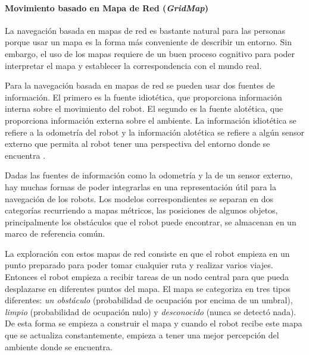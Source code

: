 \paragraph{Movimiento basado en Mapa de Red (\textit{GridMap})}

La navegaci\'on basada en mapas de red es bastante natural para las personas porque usar un mapa es 
la forma m\'as conveniente de describir un entorno. Sin embargo, el uso de los mapas requiere de 
un buen proceso cognitivo para poder interpretar el mapa y establecer la correspondencia con el 
mundo real.

Para la navegaci\'on basada en mapas de red se pueden usar dos fuentes de informaci\'on. El primero 
es la fuente idiot\'etica, que proporciona informaci\'on interna sobre el movimiento del robot. El 
segundo es la fuente alot\'etica, que proporciona informaci\'on externa sobre el ambiente. La 
informaci\'on idiot\'etica se refiere a la odometr\'ia del robot y la informaci\'on alot\'etica 
se refiere a alg\'un sensor externo que permita al robot tener una perspectiva del entorno donde 
se encuentra \cite{thrun2003learning}.

Dadas las fuentes de informaci\'on como la odometr\'ia y la de un sensor externo, hay muchas formas 
de poder integrarlas en una representaci\'on \'util para la navegaci\'on de los robots. Los 
modelos correspondientes se separan en dos categor\'ias recurriendo a mapas m\'etricos, las posiciones 
de algunos objetos, principalmente los obst\'aculos que el robot puede encontrar, se almacenan en un 
marco de referencia com\'un.

La exploraci\'on con estos mapas de red consiste en que el robot empieza en un punto preparado para 
poder tomar cualquier ruta y realizar varios viajes. Entonces el robot empieza a recibir tareas 
de un nodo central para que pueda desplazarse en diferentes puntos del mapa. El mapa se categoriza 
en tres tipos diferentes: \textit{un obst\'aculo} (probabilidad de ocupaci\'on por encima de un umbral), 
\textit{limpio} (probabilidad de ocupaci\'on nulo) y \textit{desconocido} (nunca se detect\'o nada). De 
esta forma se empieza a construir el mapa y cuando el robot recibe este mapa que se actualiza 
constantemente, empieza a tener una mejor percepci\'on del ambiente donde se encuentra.


